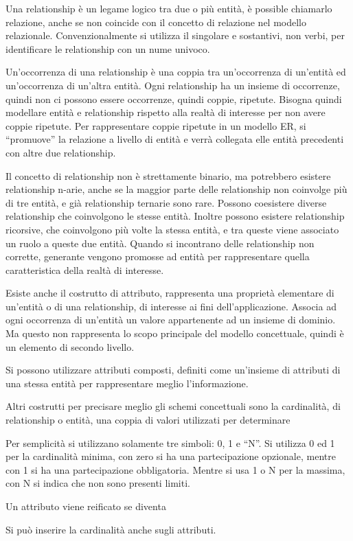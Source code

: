 \documentclass{article}
\numberwithin{equation}{subsection}
\begin{document}
Una relationship è un legame logico tra due o più entità, è possible chiamarlo relazione, anche se non coincide con il concetto di relazione nel modello relazionale. 
Convenzionalmente si utilizza il singolare e sostantivi, non verbi, per identificare le relationship con un nume univoco. 

Un'occorrenza di una relationship è una coppia tra un'occorrenza di un'entità ed un'occorrenza di un'altra entità. Ogni relationship ha un insieme di occorrenze, quindi 
non ci possono essere occorrenze, quindi coppie, ripetute. 
Bisogna quindi modellare entità e relationship rispetto alla realtà di interesse per non avere coppie ripetute. Per rappresentare coppie ripetute in un modello ER, si 
``promuove'' la relazione a livello di entità e verrà collegata elle entità precedenti con altre due relationship. 

Il concetto di relationship non è strettamente binario, ma potrebbero esistere relationship n-arie, anche se la maggior parte delle relationship non coinvolge più di tre 
entità, e già relationship ternarie sono rare. 
Possono coesistere diverse relationship che coinvolgono le stesse entità. Inoltre possono esistere relationship ricorsive, che coinvolgono più volte la stessa entità, 
e tra queste viene associato un ruolo a queste due entità. Quando si incontrano delle relationship non corrette, generante vengono promosse ad entità per rappresentare 
quella caratteristica della realtà di interesse. 

Esiste anche il costrutto di attributo, rappresenta una proprietà elementare di un'entità o di una relationship, di interesse ai fini dell'applicazione. Associa ad ogni 
occorrenza di un'entità un valore appartenente ad un insieme di dominio. Ma questo non rappresenta lo scopo principale del modello concettuale, quindi è un elemento 
di secondo livello. 

Si possono utilizzare attributi composti, definiti come un'insieme di attributi di una stessa entità per rappresentare meglio l'informazione. 


Altri costrutti per precisare meglio gli schemi concettuali sono la cardinalità, di relationship o entità, una coppia di valori utilizzati per determinare %

Per semplicità si utilizzano solamente tre simboli: 0, 1 e ``N''. Si utilizza 0 ed 1 per la cardinalità minima, con zero si ha una partecipazione opzionale, mentre 
con 1 si ha una partecipazione obbligatoria. Mentre si usa 1 o N per la massima, con N si indica che non sono presenti limiti. 


Un attributo viene reificato se diventa %

Si può inserire la cardinalità anche sugli attributi. 
\end{document}
